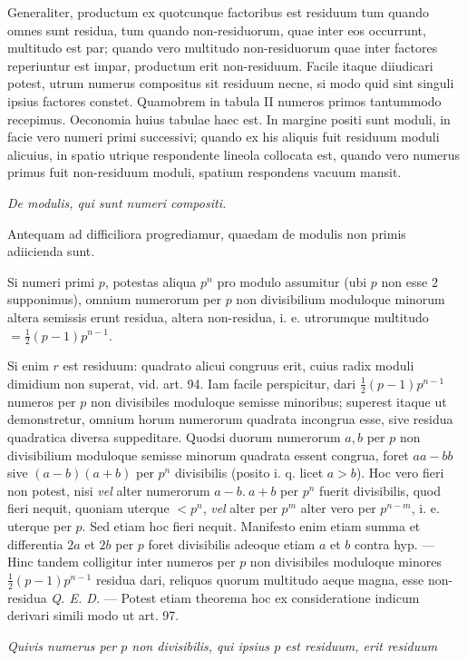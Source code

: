 Generaliter, productum ex quotcunque factoribus est residuum tum quando omnes sunt residua, tum quando non-residuorum, quae inter eos occurrunt, multitudo est par; quando vero multitudo non-residuorum quae inter factores reperiuntur est impar, productum erit non-residuum. Facile itaque diiudicari potest,
utrum numerus compositus sit residuum necne, si modo quid sint singuli ipsius factores constet. Quamobrem in tabula II numeros primos tantummodo recepimus. Oeconomia huius tabulae haec est. In margine positi sunt moduli, in facie vero numeri primi successivi; quando ex his aliquis fuit residuum moduli alicuius, in spatio utrique respondente lineola collocata est, quando vero numerus primus fuit non-residuum moduli, spatium respondens vacuum mansit.

\begin{center}\small\emph{De modulis, qui sunt numeri compositi.}\end{center}

Antequam ad difficiliora progrediamur, quaedam de modulis non primis adiicienda sunt.

Si numeri primi $p$, potestas aliqua $p^n$ pro modulo assumitur (ubi $p$ non esse $2$ supponimus), omnium numerorum per $p$ non divisibilium moduloque minorum altera semissis erunt residua, altera non-residua, i. e. utrorumque multitudo $=\tfrac12(p-1)p^{n-1}$.

Si enim $r$ est residuum: quadrato alicui congruus erit, cuius radix moduli dimidium non superat, vid. art. 94. Iam facile perspicitur, dari $\tfrac12(p-1)p^{n-1}$ numeros per $p$ non divisibiles moduloque semisse minoribus; superest itaque ut demonstretur, omnium horum numerorum quadrata incongrua esse, sive residua quadratica diversa suppeditare. Quodsi duorum numerorum $a,b$ per $p$ non divisibilium moduloque semisse minorum quadrata essent congrua, foret $aa-bb$ sive $(a-b)(a+b)$ per $p^n$ divisibilis (posito i. q. licet $a>b$). Hoc vero fieri non potest, nisi \emph{vel} alter numerorum $a-b.\ a+b$ per $p^n$ fuerit divisibilis, quod fieri nequit, quoniam uterque $<p^n$, \emph{vel} alter per $p^m$ alter vero per $p^{n-m}$, i. e. uterque per $p$. Sed etiam hoc fieri nequit. Manifesto enim etiam summa et differentia $2a$ et $2b$ per $p$ foret divisibilis adeoque etiam $a$ et $b$ contra hyp. --- Hinc tandem colligitur inter numeros per $p$ non divisibiles moduloque minores $\tfrac12(p-1)p^{n-1}$ residua dari, reliquos quorum multitudo aeque magna, esse non-residua \emph{Q. E. D.} --- Potest etiam theorema hoc ex consideratione indicum derivari simili modo ut art. 97.

\emph{Quivis numerus per $p$ non divisibilis, qui ipsius $p$ est residuum, erit residuum}
